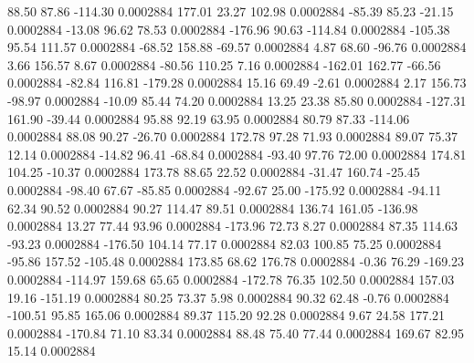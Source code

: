        88.50       87.86     -114.30     0.0002884
      177.01       23.27      102.98     0.0002884
      -85.39       85.23      -21.15     0.0002884
      -13.08       96.62       78.53     0.0002884
     -176.96       90.63     -114.84     0.0002884
     -105.38       95.54      111.57     0.0002884
      -68.52      158.88      -69.57     0.0002884
        4.87       68.60      -96.76     0.0002884
        3.66      156.57        8.67     0.0002884
      -80.56      110.25        7.16     0.0002884
     -162.01      162.77      -66.56     0.0002884
      -82.84      116.81     -179.28     0.0002884
       15.16       69.49       -2.61     0.0002884
        2.17      156.73      -98.97     0.0002884
      -10.09       85.44       74.20     0.0002884
       13.25       23.38       85.80     0.0002884
     -127.31      161.90      -39.44     0.0002884
       95.88       92.19       63.95     0.0002884
       80.79       87.33     -114.06     0.0002884
       88.08       90.27      -26.70     0.0002884
      172.78       97.28       71.93     0.0002884
       89.07       75.37       12.14     0.0002884
      -14.82       96.41      -68.84     0.0002884
      -93.40       97.76       72.00     0.0002884
      174.81      104.25      -10.37     0.0002884
      173.78       88.65       22.52     0.0002884
      -31.47      160.74      -25.45     0.0002884
      -98.40       67.67      -85.85     0.0002884
      -92.67       25.00     -175.92     0.0002884
      -94.11       62.34       90.52     0.0002884
       90.27      114.47       89.51     0.0002884
      136.74      161.05     -136.98     0.0002884
       13.27       77.44       93.96     0.0002884
     -173.96       72.73        8.27     0.0002884
       87.35      114.63      -93.23     0.0002884
     -176.50      104.14       77.17     0.0002884
       82.03      100.85       75.25     0.0002884
      -95.86      157.52     -105.48     0.0002884
      173.85       68.62      176.78     0.0002884
       -0.36       76.29     -169.23     0.0002884
     -114.97      159.68       65.65     0.0002884
     -172.78       76.35      102.50     0.0002884
      157.03       19.16     -151.19     0.0002884
       80.25       73.37        5.98     0.0002884
       90.32       62.48       -0.76     0.0002884
     -100.51       95.85      165.06     0.0002884
       89.37      115.20       92.28     0.0002884
        9.67       24.58      177.21     0.0002884
     -170.84       71.10       83.34     0.0002884
       88.48       75.40       77.44     0.0002884
      169.67       82.95       15.14     0.0002884
